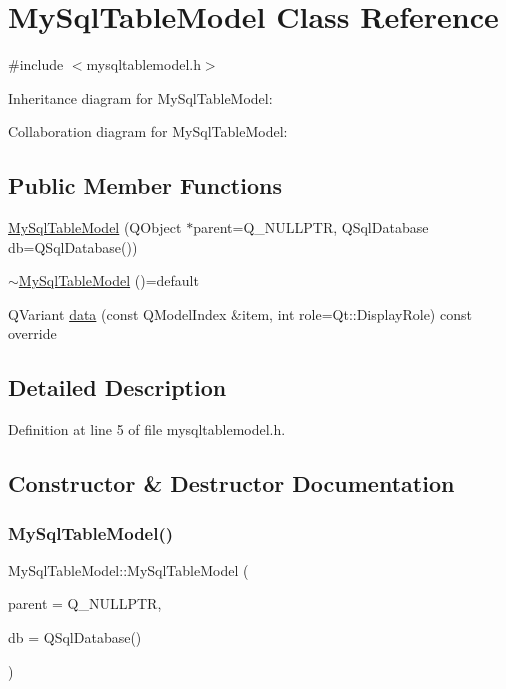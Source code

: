 \hypertarget{class_my_sql_table_model}{}\section{My\+Sql\+Table\+Model Class Reference}
\label{class_my_sql_table_model}


{\ttfamily \#include $<$mysqltablemodel.\+h$>$}



Inheritance diagram for My\+Sql\+Table\+Model\+:


Collaboration diagram for My\+Sql\+Table\+Model\+:
\subsection*{Public Member Functions}
\begin{DoxyCompactItemize}
\item 
\mbox{\hyperlink{class_my_sql_table_model_ad08ebbe732d911b5bd17f8280cbcda43}{My\+Sql\+Table\+Model}} (Q\+Object $\ast$parent=Q\+\_\+\+N\+U\+L\+L\+P\+TR, Q\+Sql\+Database db=Q\+Sql\+Database())
\item 
\mbox{\hyperlink{class_my_sql_table_model_a625c9567e0060469977695e2c5996730}{$\sim$\+My\+Sql\+Table\+Model}} ()=default
\item 
Q\+Variant \mbox{\hyperlink{class_my_sql_table_model_ac6a066535d9c183b28710f8e8fc616bd}{data}} (const Q\+Model\+Index \&item, int role=Qt\+::\+Display\+Role) const override
\end{DoxyCompactItemize}


\subsection{Detailed Description}


Definition at line 5 of file mysqltablemodel.\+h.



\subsection{Constructor \& Destructor Documentation}
\mbox{\label{class_my_sql_table_model_ad08ebbe732d911b5bd17f8280cbcda43}} 
\subsubsection{\texorpdfstring{My\+Sql\+Table\+Model()}{MySqlTableModel()}}
{\footnotesize\ttfamily My\+Sql\+Table\+Model\+::\+My\+Sql\+Table\+Model (\begin{DoxyParamCaption}\item[{Q\+Object $\ast$}]{parent = {\ttfamily Q\+\_\+NULLPTR},  }\item[{Q\+Sql\+Database}]{db = {\ttfamily QSqlDatabase()} }\end{DoxyParamCaption})\hspace{0.3cm}{\ttfamily [inline]}}



